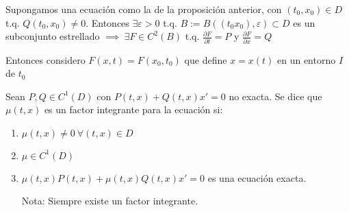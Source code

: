 Supongamos una ecuación como la de la proposición anterior, con $(t_0, x_0) \in D$ t.q. $Q(t_0, x_0) \neq 0$. Entonces $\exists \varepsilon > 0$ t.q. $B  := B( (t_0 x_0 ), \varepsilon) \subset D$ es un subconjunto estrellado $\implies \ \exists F \in C^2 (B)$ t.q. $\frac{\partial F}{\partial t} = P$ y $\frac{\partial F}{\partial x} = Q$

Entonces considero  $F(x,t) = F(x_0, t_0)$ que define $x=x(t)$ en un entorno $I$ de $t_0$


\begin{ndef}
Sean $P,Q \in C^1 (D)$ con $P(t,x) + Q(t,x) x' = 0$ no exacta. Se dice que $\mu (t,x)$ es un factor integrante para la ecuación si:
\begin{enumerate}
\item $\mu(t,x) \neq 0 \ \forall (t,x) \in D$
\item $\mu \in C^1 (D)$
\item $\mu (t,x)P(t,x) + \mu (t,x)Q(t,x) x' = 0$ es una ecuación exacta.

Nota: Siempre existe un factor integrante.
\end{enumerate}

\end{ndef}



